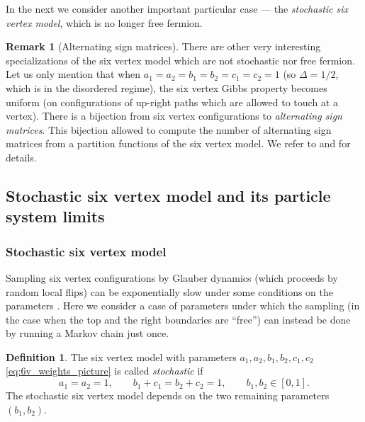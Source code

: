 \documentclass[letterpaper,11pt,oneside,reqno]{article}
\numberwithin{equation}{section}
\theoremstyle{definition}
\newtheorem{definition}[proposition]{Definition}
\newtheorem{remark}[proposition]{Remark}
\theoremstyle{remark}
\begin{document}
In the next 
we consider another important particular case --- the 
\emph{stochastic six vertex model}, which is no longer free fermion.

\begin{remark}[Alternating sign matrices]
	There are other very interesting specializations
	of the six vertex model 
	which are not stochastic
	nor free fermion. Let us only mention
	that when $a_1=a_2=b_1=b_2=c_1=c_2=1$ (so $\Delta=1/2$, which is in the disordered regime),
	the six vertex Gibbs property becomes uniform
	(on configurations of up-right paths which are allowed to touch at a vertex).
	There is a bijection from six vertex configurations to 
	\emph{alternating sign matrices}. 
	This bijection allowed to compute the number of alternating sign matrices
	from a partition functions of the six vertex model.
	We refer to 
	\cite{kuperberg1996another} and
	\cite{Propp2001} for details.
\end{remark}

\subsection{Stochastic six vertex model and its particle system limits}
\label{sub:s6v_and_degenerations}

\subsubsection{Stochastic six vertex model}

Sampling six vertex configurations 
by Glauber dynamics (which proceeds by random local flips)
can be exponentially slow under some conditions on the parameters
\cite{FahrbachRandall2019}.
Here we consider a case of parameters 
under which the sampling 
(in the case when the top and the right boundaries are ``free'')
can instead be done by running a Markov chain just once.

\begin{definition}
	\label{def:s6v}
	The six vertex model with parameters $a_1,a_2,b_1,b_2,c_1,c_2$ 
	\eqref{eq:6v_weights_picture}
	is called \emph{stochastic}
	if 
	\begin{equation}
		\label{eq:s6v_condition}
		a_1=a_2=1,\qquad 
		b_1+c_1=b_2+c_2=1,\qquad 
		b_1,b_2\in[0,1].
	\end{equation}
	The stochastic six vertex model depends on the 
	two remaining parameters
	$(b_1,b_2)$.
\end{definition}
\end{document}
